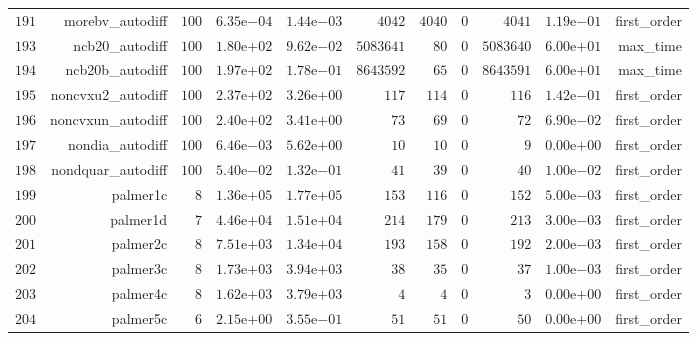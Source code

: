 \documentclass[varwidth=20cm,crop=true]{standalone}
\begin{document}
\begin{longtable}{rrrrrrrrrrr}
  \(   191\) & morebv\_autodiff & \(   100\) & \( 6.35\)e\(-04\) & \( 1.44\)e\(-03\) & \(  4042\) & \(  4040\) & \(     0\) & \(  4041\) & \( 1.19\)e\(-01\) & first\_order \\
  \(   193\) & ncb20\_autodiff & \(   100\) & \( 1.80\)e\(+02\) & \( 9.62\)e\(-02\) & \(5083641\) & \(    80\) & \(     0\) & \(5083640\) & \( 6.00\)e\(+01\) & max\_time \\
  \(   194\) & ncb20b\_autodiff & \(   100\) & \( 1.97\)e\(+02\) & \( 1.78\)e\(-01\) & \(8643592\) & \(    65\) & \(     0\) & \(8643591\) & \( 6.00\)e\(+01\) & max\_time \\
  \(   195\) & noncvxu2\_autodiff & \(   100\) & \( 2.37\)e\(+02\) & \( 3.26\)e\(+00\) & \(   117\) & \(   114\) & \(     0\) & \(   116\) & \( 1.42\)e\(-01\) & first\_order \\
  \(   196\) & noncvxun\_autodiff & \(   100\) & \( 2.40\)e\(+02\) & \( 3.41\)e\(+00\) & \(    73\) & \(    69\) & \(     0\) & \(    72\) & \( 6.90\)e\(-02\) & first\_order \\
  \(   197\) & nondia\_autodiff & \(   100\) & \( 6.46\)e\(-03\) & \( 5.62\)e\(+00\) & \(    10\) & \(    10\) & \(     0\) & \(     9\) & \( 0.00\)e\(+00\) & first\_order \\
  \(   198\) & nondquar\_autodiff & \(   100\) & \( 5.40\)e\(-02\) & \( 1.32\)e\(-01\) & \(    41\) & \(    39\) & \(     0\) & \(    40\) & \( 1.00\)e\(-02\) & first\_order \\
  \(   199\) & palmer1c & \(     8\) & \( 1.36\)e\(+05\) & \( 1.77\)e\(+05\) & \(   153\) & \(   116\) & \(     0\) & \(   152\) & \( 5.00\)e\(-03\) & first\_order \\
  \(   200\) & palmer1d & \(     7\) & \( 4.46\)e\(+04\) & \( 1.51\)e\(+04\) & \(   214\) & \(   179\) & \(     0\) & \(   213\) & \( 3.00\)e\(-03\) & first\_order \\
  \(   201\) & palmer2c & \(     8\) & \( 7.51\)e\(+03\) & \( 1.34\)e\(+04\) & \(   193\) & \(   158\) & \(     0\) & \(   192\) & \( 2.00\)e\(-03\) & first\_order \\
  \(   202\) & palmer3c & \(     8\) & \( 1.73\)e\(+03\) & \( 3.94\)e\(+03\) & \(    38\) & \(    35\) & \(     0\) & \(    37\) & \( 1.00\)e\(-03\) & first\_order \\
  \(   203\) & palmer4c & \(     8\) & \( 1.62\)e\(+03\) & \( 3.79\)e\(+03\) & \(     4\) & \(     4\) & \(     0\) & \(     3\) & \( 0.00\)e\(+00\) & first\_order \\
  \(   204\) & palmer5c & \(     6\) & \( 2.15\)e\(+00\) & \( 3.55\)e\(-01\) & \(    51\) & \(    51\) & \(     0\) & \(    50\) & \( 0.00\)e\(+00\) & first\_order \\

\end{longtable}
\end{document}
